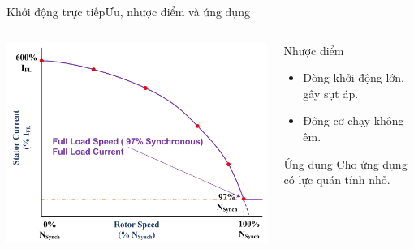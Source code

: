 \documentclass[17pt]{beamer}
\begin{document}
\begin{frame}{Khởi động trực tiếp}{Ưu, nhược điểm và ứng dụng}
\vspace{-.5cm}
\begin{columns}

\begin{center}
\includegraphics[scale=.5]{images-chude1/dongdien-tocdo.png} 
\end{center}
\begin{small}	
\begin{block}{Nhược điểm}
\begin{itemize}
\item Dòng khởi động lớn, gây sụt áp.
\item Đông cơ chạy không êm.
\end{itemize}
\end{block}			
\begin{block}{Ứng dụng}
Cho ứng dụng có lực quán tính nhỏ.
\end{block}
\end{small}
\end{columns}
\end{frame}

\end{document}
